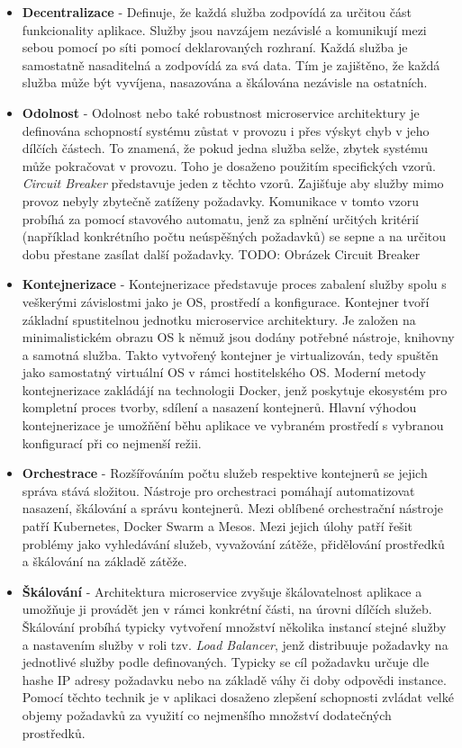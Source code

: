 \begin{itemize}
    \item \textbf{Decentralizace} - Definuje, že každá služba zodpovídá za určitou část funkcionality aplikace. Služby jsou navzájem nezávislé a komunikují mezi sebou pomocí po síti pomocí deklarovaných rozhraní. Každá služba je samostatně nasaditelná a zodpovídá za svá data. \cite{Gammelgaard2021} Tím je zajištěno, že každá služba může být vyvíjena, nasazována a škálována nezávisle na ostatních.
    \item \textbf{Odolnost} - Odolnost nebo také robustnost microservice architektury je definována schopností systému zůstat v provozu i přes výskyt chyb v jeho dílčích částech. To znamená, že pokud jedna služba selže, zbytek systému může pokračovat v provozu. Toho je dosaženo použitím specifických vzorů. \emph{Circuit Breaker} představuje jeden z těchto vzorů. Zajišťuje aby služby mimo provoz nebyly zbytečně zatíženy požadavky. Komunikace v tomto vzoru probíhá za pomocí stavového automatu, jenž za splnění určitých kritérií (například konkrétního počtu neúspěšných požadavků) se sepne a na určitou dobu přestane zasílat další požadavky. \cite{Gammelgaard2021}
    TODO: Obrázek Circuit Breaker
    \item \textbf{Kontejnerizace} - Kontejnerizace představuje proces zabalení služby spolu s veškerými závislostmi jako je OS, prostředí a konfigurace. Kontejner tvoří základní spustitelnou jednotku microservice architektury. Je založen na minimalistickém obrazu OS k němuž jsou dodány potřebné nástroje, knihovny a samotná služba. Takto vytvořený kontejner je virtualizován, tedy spuštěn jako samostatný virtuální OS v rámci hostitelského OS. \cite{dockerdocs} Moderní metody kontejnerizace zakládájí na technologii Docker, jenž poskytuje ekosystém pro kompletní proces tvorby, sdílení a nasazení kontejnerů. Hlavní výhodou kontejnerizace je umožňění běhu aplikace ve vybraném prostředí s vybranou konfigurací při co nejmenší režii.
    \item \textbf{Orchestrace} - Rozšířováním počtu služeb respektive kontejnerů se jejich správa stává složitou. Nástroje pro orchestraci pomáhají automatizovat nasazení, škálování a správu kontejnerů. Mezi oblíbené orchestrační nástroje patří Kubernetes, Docker Swarm a Mesos. Mezi jejich úlohy patří řešit problémy jako vyhledávání služeb, vyvažování zátěže, přidělování prostředků a škálování na základě zátěže.
    \item \textbf{Škálování} - Architektura microservice zvyšuje škálovatelnost aplikace a umožňuje ji provádět jen v rámci konkrétní části, na úrovni dílčích služeb. Škálování probíhá typicky vytvoření množství několika instancí stejné služby a nastavením služby v roli tzv. \emph{Load Balancer}, jenž distribuuje požadavky na jednotlivé služby podle definovaných. Typicky se cíl požadavku určuje dle hashe IP adresy požadavku nebo na základě váhy či doby odpovědi instance. Pomocí těchto technik je v aplikaci dosaženo zlepšení schopnosti zvládat velké objemy požadavků za využití co nejmenšího množství dodatečných prostředků. \cite{Gammelgaard2021}
\end{itemize}

